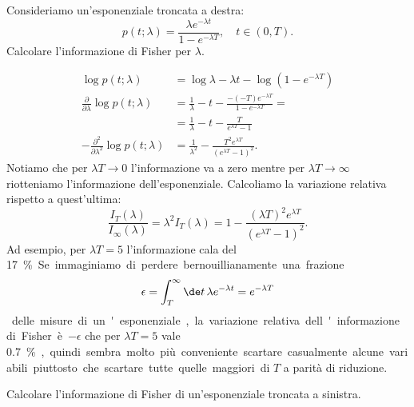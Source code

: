 
\begin{exercise}
	\label{th:troncexp}
	Consideriamo un'esponenziale troncata a destra:
	\begin{equation*}
		p(t;\lambda)
		= \frac{\lambda e^{-\lambda t}}{1 - e^{-\lambda T}},
		\quad t \in (0,T).
	\end{equation*}
	Calcolare l'informazione di Fisher per $\lambda$.
\end{exercise}

\begin{solution}
	\begin{align*}
		\log p(t;\lambda)
		&= \log\lambda - \lambda t - \log(1-e^{-\lambda T}) \\
		\frac{\partial}{\partial\lambda} \log p(t;\lambda)
		&= \frac1\lambda - t - \frac{-(-T)e^{-\lambda T}}{1-e^{-\lambda T}} = \\
		&= \frac1\lambda - t - \frac{T}{e^{\lambda T}-1} \\
		-\frac{\partial^2}{\partial\lambda^2} \log p(t;\lambda)
		&= \frac1{\lambda^2} - \frac{T^2e^{\lambda T}}{(e^{\lambda T}-1)^2}.
	\end{align*}
	Notiamo che per $\lambda T\to0$ l'informazione va a zero mentre per $\lambda T\to\infty$
	riotteniamo l'informazione dell'esponenziale.
	Calcoliamo la variazione relativa rispetto a quest'ultima:
	\begin{equation*}
		\frac{I_T(\lambda)}{I_\infty(\lambda)}
		= \lambda^2 I_T(\lambda)
		= 1 - \frac {(\lambda T)^2e^{\lambda T}} {(e^{\lambda T}-1)^2}.
	\end{equation*}
	Ad esempio, per $\lambda T=5$ l'informazione cala del \SI{17}\percent.
	Se immaginiamo di perdere bernouillianamente una frazione
	\begin{equation*}
		\epsilon
		= \int_T^\infty \de t\, \lambda e^{-\lambda t}
		= e^{-\lambda T}
	\end{equation*}
	delle misure di un'esponenziale,
	la variazione relativa dell'informazione di Fisher è~$-\epsilon$
	che per $\lambda T=5$ vale \SI{0.7}\percent, quindi sembra molto più
    conveniente scartare casualmente alcune variabili piuttosto che
    scartare tutte quelle maggiori di $T$ a parità di riduzione.
\end{solution}

\begin{exercise}
	Calcolare l'informazione di Fisher di un'esponenziale troncata a sinistra.
\end{exercise}

